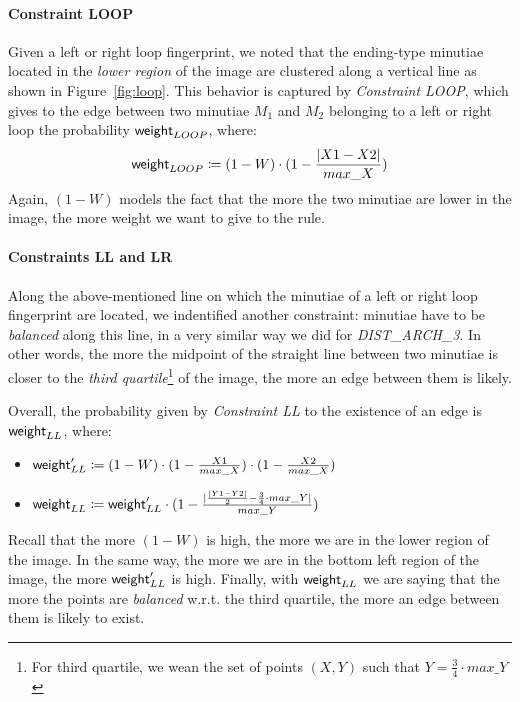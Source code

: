 \documentclass[8pt]{article}
\begin{document}
\paragraph{Constraint LOOP}
Given a left or right loop fingerprint, we noted that the ending-type
minutiae located in the \emph{lower region} of the image are clustered along
a vertical line as shown in Figure~\cref{fig:loop}.  
This behavior is captured by \emph{Constraint LOOP}, which gives to
the edge between two minutiae $M_1$ and $M_2$ belonging to a left or right loop
the probability $\textsf{weight}_{LOOP}$, where:
  \begin{align*}
    \textsf{weight}_{LOOP} \coloneqq
    (1-W)\cdot 
    (1-\frac{\lvert X1-X2 \rvert}{max\_X})
  \end{align*}
Again, $(1-W)$ models the fact that the more the two minutiae are lower in 
the image, the more weight we want to give to the rule.  



\paragraph{Constraints LL and LR}
Along the above-mentioned line on which the minutiae of a left or right loop
fingerprint are located, we indentified another constraint: minutiae have to
be \emph{balanced} along this line, in a very similar way we did for
\emph{DIST\_ARCH\_3}. In other words, the more the midpoint of the straight line 
between two minutiae is closer to the \emph{third quartile}\footnote{For third
quartile, we wean the set of points $(X,Y)$ such that $Y=\frac{3}{4}\cdot
max\_Y$} of the image, the more an edge between them is likely.

Overall, the probability given by \emph{Constraint LL} to the existence of
an edge is $\textsf{weight}_{LL}$, where:
  \begin{itemize}
    \item
      $\textsf{weight}_{LL}^\prime \coloneqq 
        (1-W) \cdot (1-\frac{X1}{max\_X}) \cdot (1-\frac{X2}{max\_X})$ 
    \item
      $\textsf{weight}_{LL} \coloneqq
        \textsf{weight}_{LL}^\prime \cdot (1-
        \frac{\lvert \frac{\lvert Y1-Y2 \rvert}{2} - \frac{3}{4}\cdot max\_Y
        \rvert}{max\_Y})$
  \end{itemize}
Recall that the more $(1-W)$ is high, the more we are in the lower region
of the image. In the same way, the more we are in the bottom left region of the
image, the more $\textsf{weight}_{LL}^\prime$ is high. 
Finally, with $\textsf{weight}_{LL}$ we are saying that the more the points are 
\emph{balanced} w.r.t. the third quartile, the more an edge between them
is likely to exist.
\end{document}
